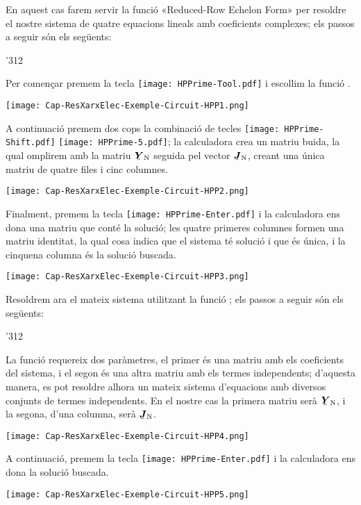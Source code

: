 \begin{exemple}
    En aquest cas farem servir la funció  «Reduced-Row Echelon Form» per resoldre el nostre sistema de quatre equacions lineals amb coeficients complexes; els passos a seguir són els següents:

    \begin{dingautolist}{'312}
         \item Per començar premem la tecla \texttt{[image: HPPrime-Tool.pdf]} i escollim la funció .

             \texttt{[image: Cap-ResXarxElec-Exemple-Circuit-HPP1.png]}
         \item A continuació premem dos cops la combinació de tecles  \texttt{[image: HPPrime-Shift.pdf]} \texttt{[image: HPPrime-5.pdf]}; la calculadora crea un matriu buida, la qual omplirem amb la matriu $\mcmplx{Y}\ped{N}$ seguida pel vector $\mcmplx{J}\ped{N}$, creant una única matriu de quatre files i cinc columnes.

             \texttt{[image: Cap-ResXarxElec-Exemple-Circuit-HPP2.png]}

         \item Finalment, premem la tecla \texttt{[image: HPPrime-Enter.pdf]} i la calculadora ens dona una matriu que conté la solució; les quatre primeres columnes formen una matriu identitat, la qual cosa indica que el sistema té solució i que és única, i la cinquena columna és la  solució buscada.

         \texttt{[image: Cap-ResXarxElec-Exemple-Circuit-HPP3.png]}
    \end{dingautolist}

    Resoldrem ara el mateix sistema utilitzant  la funció ; els passos a seguir són els següents:

    \begin{dingautolist}{'312}
         \item La funció  requereix dos paràmetres, el primer és una matriu amb els coeficients del sistema, i el segon és una altra matriu amb els termes independents; d'aquesta manera, es pot resoldre alhora un mateix sistema d'equacions amb diversos conjunts de termes independents. En el nostre cas la primera matriu serà $\mcmplx{Y}\ped{N}$, i la segona, d'una columna, serà  $\mcmplx{J}\ped{N}$.

             \texttt{[image: Cap-ResXarxElec-Exemple-Circuit-HPP4.png]}

         \item A continuació, premem la tecla \texttt{[image: HPPrime-Enter.pdf]} i la calculadora ens dona la  solució buscada.

         \texttt{[image: Cap-ResXarxElec-Exemple-Circuit-HPP5.png]}
    \end{dingautolist}
\end{exemple}


